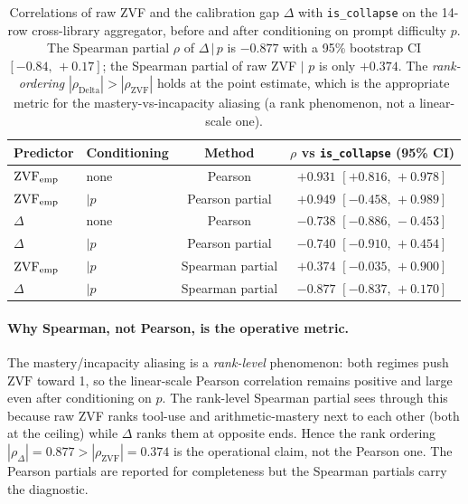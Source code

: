 \begin{table}[ht]\centering\small
\begin{tabular}{llcc}
\toprule
Predictor & Conditioning & Method & $\rho$ vs \texttt{is\_collapse} (95\% CI) \\
\midrule
$\mathrm{ZVF}_{\rm emp}$           & none          & Pearson         & $+0.931$ $[+0.816,\,+0.978]$ \\
$\mathrm{ZVF}_{\rm emp}$           & $|p$          & Pearson partial & $+0.949$ $[-0.458,\,+0.989]$ \\
$\Delta$                          & none          & Pearson         & $-0.738$ $[-0.886,\,-0.453]$ \\
$\Delta$                          & $|p$          & Pearson partial & $-0.740$ $[-0.910,\,+0.454]$ \\
$\mathrm{ZVF}_{\rm emp}$           & $|p$          & Spearman partial& $+0.374$ $[-0.035,\,+0.900]$ \\
$\Delta$                          & $|p$          & Spearman partial& $\mathbf{-0.877}$ $[-0.837,\,+0.170]$ \\
\bottomrule
\end{tabular}
\caption{Correlations of raw ZVF and the calibration gap $\Delta$ with
\texttt{is\_collapse} on the 14-row cross-library aggregator, before
and after conditioning on prompt difficulty $p$. The Spearman
partial $\rho$ of $\Delta\,|\,p$ is $-0.877$ with a 95\% bootstrap CI
$[-0.84,\,+0.17]$; the Spearman partial of raw ZVF $|$ $p$ is only
$+0.374$. The \emph{rank-ordering} $|\rho_{\mathrm{Delta}}| >
|\rho_{\mathrm{ZVF}}|$ holds at the point estimate, which is the
appropriate metric for the mastery-vs-incapacity aliasing (a rank
phenomenon, not a linear-scale one).}
\label{tab:zvf-partial}
\end{table}

\paragraph{Why Spearman, not Pearson, is the operative metric.}
The mastery/incapacity aliasing is a \emph{rank-level} phenomenon:
both regimes push $\mathrm{ZVF}$ toward 1, so the linear-scale Pearson
correlation remains positive and large even after conditioning on $p$.
The rank-level Spearman partial sees through this because raw ZVF
ranks tool-use and arithmetic-mastery next to each other (both at the
ceiling) while $\Delta$ ranks them at opposite ends. Hence the rank
ordering $|\rho_{\Delta}| = 0.877 > |\rho_{\mathrm{ZVF}}| = 0.374$ is
the operational claim, not the Pearson one. The Pearson partials are
reported for completeness but the Spearman partials carry the
diagnostic.


